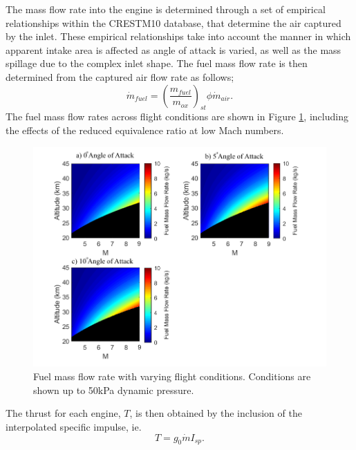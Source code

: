 The mass flow rate into the engine is determined through a set of empirical relationships within the \textsf{CRESTM10} database, that determine the air captured by the inlet. These empirical relationships take into account the manner in which apparent intake area is affected as angle of attack is varied, as well as the mass spillage due to the complex inlet shape. The fuel mass flow rate is then determined from the captured air flow rate as follows; 
\begin{equation}
\dot{m}_{fuel} = (\dfrac{m_{fuel}}{m_{ox}} )_{st} \phi \dot{m}_{air}.
\end{equation}
 The fuel mass flow rates across flight conditions are shown in Figure \ref{fig:FuelMassFlowStandard}, including the effects of the reduced equivalence ratio at low Mach numbers.


\begin{figure}[ht]
\centering
\includegraphics[width=0.85\linewidth]{figures/3_vehicle_design/FuelMassFlowStandard}
\caption{Fuel mass flow rate with varying flight conditions. Conditions are shown up to 50kPa dynamic pressure.}
\label{fig:FuelMassFlowStandard}
\end{figure}
\noindent
The thrust for each engine, $T$, is then obtained by the inclusion of the interpolated specific impulse, ie. 
\begin{equation}
T = g_0\dot{m}I_{sp}. 
\end{equation}

